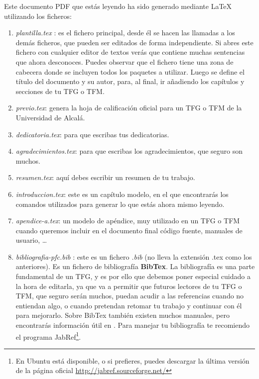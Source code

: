 Este documento PDF que estás leyendo ha sido generado mediante \LaTeX{} utilizando los ficheros:
\begin{enumerate}
\item \textit{plantilla.tex} : es el fichero principal, desde él se hacen las llamadas a los demás ficheros, que pueden ser editados de forma independiente. Si abres este fichero con cualquier editor de textos verás que contiene muchas sentencias que ahora desconoces. Puedes observar que el fichero tiene una zona de cabecera donde se incluyen todos los paquetes a utilizar. Luego se define el título del documento y su autor, para, al final, ir añadiendo los capítulos y secciones de tu \ac{TFG} o \ac{TFM}.
\item \textit{previo.tex}: genera la hoja de calificación oficial para un \ac{TFG} o \ac{TFM} de la Universidad de Alcalá.
\item \textit{dedicatoria.tex}: para que escribas tus dedicatorias.
\item \textit{agradecimientos.tex}: para que escribas los agradecimientos, que seguro son muchos.
\item \textit{resumen.tex}: aquí debes escribir un resumen de tu trabajo.
\item \textit{introduccion.tex}: este es un capítulo modelo, en el que encontrarás los comandos utilizados para generar lo que estás ahora mismo leyendo.
\item \textit{apendice-a.tex}: un modelo de apéndice, muy utilizado en un \ac{TFG} o \ac{TFM} cuando queremos incluir en el documento final código fuente, manuales de usuario, \ldots
\item \textit{bibliografia-pfc.bib} : este es un fichero \textit{.bib} (no lleva la extensión .tex como los anteriores). Es un fichero de bibliografía \textbf{BibTex}. La bibliografía es una parte fundamental de un \ac{TFG}, y es por ello que debemos poner especial cuidado a la hora de editarla, ya que va a permitir que futuros lectores de tu \ac{TFG} o \ac{TFM}, que seguro serán muchos, puedan acudir a las referencias cuando no entiendan algo, o cuando pretendan retomar tu trabajo y continuar con él para mejorarlo. Sobre BibTex también existen muchos manuales, pero encontrarás información útil en \cite{bibtex1}. Para manejar tu bibliografía te recomiendo el programa JabRef\footnote{En Ubuntu está disponible, o si prefieres, puedes descargar la última versión de la página oficial \url{http://jabref.sourceforge.net/}}.
\end{enumerate}

